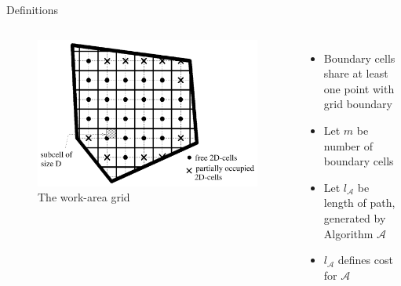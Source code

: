 \documentclass{beamer}
\begin{document}
\begin{frame}{Definitions}
    \begin{columns}
        \begin{figure}
            \includegraphics[width=\linewidth]{Images/inv_fig1.png}
            \caption{The work-area grid}
        \end{figure}
        \begin{itemize}
            \item Boundary cells share at least one point with grid boundary
            \item Let $m$ be number of boundary cells
            \item Let $l_\mathcal{A}$ be length of path, generated by Algorithm $\mathcal{A}$
            \item $l_\mathcal{A}$ defines cost for $\mathcal{A}$
        \end{itemize}
    \end{columns}
\end{frame}
\end{document}
